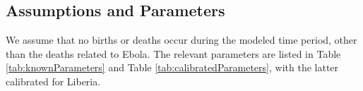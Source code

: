 


\subsection{Assumptions and Parameters}
We assume that no births or deaths occur during the modeled time period, other than the deaths related to Ebola. The relevant parameters are listed in Table \ref{tab:knownParameters} and Table \ref{tab:calibratedParameters}, with the latter calibrated for Liberia.

